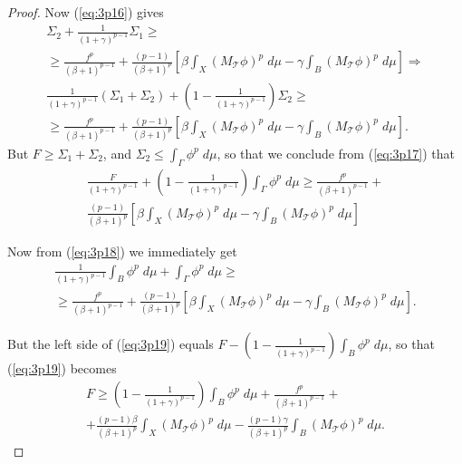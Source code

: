 \documentclass{article}
\numberwithin{equation}{section}
\theoremstyle{definition}
\theoremstyle{remark}
\newcommand{\mc}[1]{\mathcal{#1}}
\begin{document}
\begin{proof}
Now (\ref{eq:3p16}) gives
\begin{multline} \label{eq:3p17}
\Sigma_2+\frac{1}{(1+\gamma)^{p-1}}\Sigma_1\geq\\
\geq \frac{f^p}{(\beta+1)^{p-1}} + \frac{(p-1)}{(\beta+1)^p} \left[ \beta \int_X \left( M_{\mc T}\phi \right)^p\;d\mu -\gamma \int_B \left( M_{\mc T}\phi \right)^p\;d\mu \right] \Rightarrow\\
\frac{1}{(1+\gamma)^{p-1}} \left( \Sigma_1 + \Sigma_2 \right)+ \left( 1-\frac{1}{(1+\gamma)^{p-1}} \right)\Sigma_2\geq\\
\geq   \frac{f^p}{(\beta+1)^{p-1}}+ \frac{(p-1)}{(\beta+1)^p} \left[ \beta \int_X \left( M_{\mc T}\phi \right)^p\;d\mu -\gamma \int_B \left( M_{\mc T}\phi \right)^p\;d\mu \right].
\end{multline}
But $F\geq\Sigma_1+\Sigma_2$, and $\Sigma_2\leq \int_\Gamma \phi^p\;d\mu$, so that we conclude from (\ref{eq:3p17}) that
\begin{multline} \label{eq:3p18}
\frac{F}{(1+\gamma)^{p-1}} +  \left( 1-\frac{1}{(1+\gamma)^{p-1}} \right) \int_\Gamma \phi^p\;d\mu \geq \frac{f^p}{(\beta+1)^{p-1}}+\\
\frac{(p-1)}{(\beta+1)^p} \left[ \beta \int_X \left( M_{\mc T}\phi \right)^p\;d\mu -\gamma \int_B \left( M_{\mc T}\phi \right)^p\;d\mu \right]
\end{multline}

Now from (\ref{eq:3p18}) we immediately get
\begin{multline} \label{eq:3p19}
\frac{1}{(1+\gamma)^{p-1}}\int_B \phi^p\; d\mu + \int_\Gamma \phi^p\;d\mu \geq\\ \geq \frac{f^p}{(\beta+1)^{p-1}}+\frac{(p-1)}{(\beta+1)^p} \left[ \beta \int_X \left( M_{\mc T}\phi \right)^p\;d\mu -\gamma \int_B \left( M_{\mc T}\phi \right)^p\;d\mu \right].
\end{multline}

But the left side of (\ref{eq:3p19}) equals $F-\left(1-\frac{1}{(1+\gamma)^{p-1}} \right) \int_B \phi^p \; d\mu$, so that (\ref{eq:3p19}) becomes
\begin{multline} \label{eq:3p20}
F\geq \left( 1-\frac{1}{(1+\gamma)^{p-1}} \right) \int_B\phi^p\;d\mu + \frac{f^p}{(\beta+1)^{p-1}} +\\
+ \frac{(p-1)\beta}{(\beta+1)^p} \int_X \left( M_{\mc T}\phi \right)^p\;d\mu - \frac{(p-1)\gamma}{(\beta+1)^p} \int_B \left( M_{\mc T}\phi \right)^p\;d\mu.
\end{multline}



\end{proof}
\end{document}
